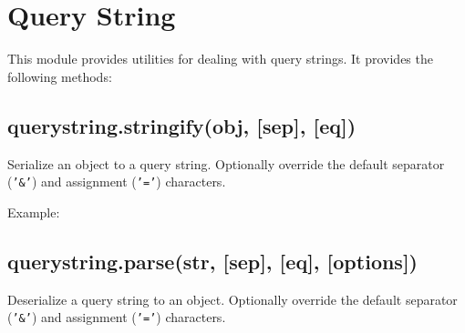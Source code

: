 \section{Query String}

\begin{Shaded}
\begin{Highlighting}[]
\NormalTok{: } 
\end{Highlighting}
\end{Shaded}

This module provides utilities for dealing with query strings. It
provides the following methods:

\subsection{querystring.stringify(obj, {[}sep{]}, {[}eq{]})}

Serialize an object to a query string. Optionally override the default
separator (\texttt{'\&'}) and assignment (\texttt{'='}) characters.

Example:

\begin{Shaded}
\begin{Highlighting}[]
\NormalTok{(\{ }\NormalTok{: }\NormalTok{, }\NormalTok{: [}\NormalTok{, }\NormalTok{], }\NormalTok{: } \NormalTok{\})}

\NormalTok{(\{}\NormalTok{: }\NormalTok{, }\NormalTok{: }\NormalTok{\}, }\NormalTok{, }\NormalTok{)}
\end{Highlighting}
\end{Shaded}

\subsection{querystring.parse(str, {[}sep{]}, {[}eq{]}, {[}options{]})}

Deserialize a query string to an object. Optionally override the default
separator (\texttt{'\&'}) and assignment (\texttt{'='}) characters.

